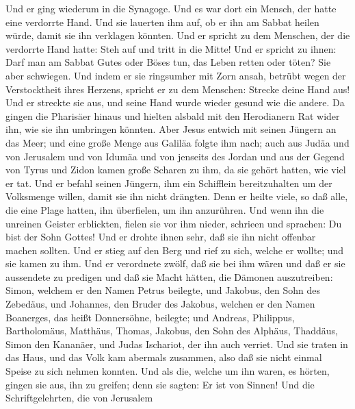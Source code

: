  Und er ging wiederum in die Synagoge. Und es war dort ein
Mensch, der hatte eine verdorrte Hand.  Und sie lauerten
ihm auf, ob er ihn am Sabbat heilen würde, damit sie ihn verklagen
könnten.  Und er spricht zu dem Menschen, der die
verdorrte Hand hatte: Steh auf und tritt in die Mitte! 
Und er spricht zu ihnen: Darf man am Sabbat Gutes oder Böses tun, das
Leben retten oder töten? Sie aber schwiegen.  Und indem er
sie ringsumher mit Zorn ansah, betrübt wegen der Verstocktheit ihres
Herzens, spricht er zu dem Menschen: Strecke deine Hand aus! Und er
streckte sie aus, und seine Hand wurde wieder gesund wie die andere.
 Da gingen die Pharisäer hinaus und hielten alsbald mit
den Herodianern Rat wider ihn, wie sie ihn umbringen könnten.
 Aber Jesus entwich mit seinen Jüngern an das Meer; und
eine große Menge aus Galiläa folgte ihm nach; auch aus Judäa
 und von Jerusalem und von Idumäa und von jenseits des
Jordan und aus der Gegend von Tyrus und Zidon kamen große Scharen zu
ihm, da sie gehört hatten, wie viel er tat.  Und er befahl
seinen Jüngern, ihm ein Schifflein bereitzuhalten um der Volksmenge
willen, damit sie ihn nicht drängten.  Denn er heilte
viele, so daß alle, die eine Plage hatten, ihn überfielen, um ihn
anzurühren.  Und wenn ihn die unreinen Geister
erblickten, fielen sie vor ihm nieder, schrieen und sprachen: Du bist
der Sohn Gottes!  Und er drohte ihnen sehr, daß sie ihn
nicht offenbar machen sollten.  Und er stieg auf den Berg
und rief zu sich, welche er wollte; und sie kamen zu ihm.
 Und er verordnete zwölf, daß sie bei ihm wären und daß
er sie aussendete zu predigen  und daß sie Macht hätten,
die Dämonen auszutreiben:  Simon, welchem er den Namen
Petrus beilegte,  und Jakobus, den Sohn des Zebedäus, und
Johannes, den Bruder des Jakobus, welchen er den Namen Boanerges, das
heißt Donnersöhne, beilegte;  und Andreas, Philippus,
Bartholomäus, Matthäus, Thomas, Jakobus, den Sohn des Alphäus, Thaddäus,
Simon den Kananäer,  und Judas Ischariot, der ihn auch
verriet.  Und sie traten in das Haus, und das Volk kam
abermals zusammen, also daß sie nicht einmal Speise zu sich nehmen
konnten.  Und als die, welche um ihn waren, es hörten,
gingen sie aus, ihn zu greifen; denn sie sagten: Er ist von Sinnen!
 Und die Schriftgelehrten, die von Jerusalem
